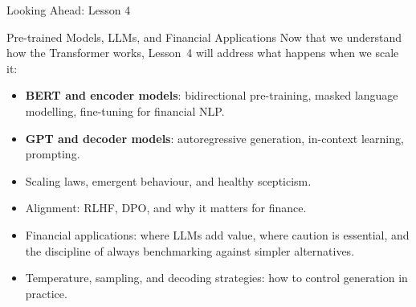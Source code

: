 \documentclass[aspectratio=169]{beamer}
\begin{document}
\begin{frame}{Looking Ahead: Lesson 4}
  \begin{block}{Pre-trained Models, LLMs, and Financial Applications}
    Now that we understand how the Transformer works, Lesson~4 will address what
    happens when we scale it:
  \end{block}
  \begin{itemize}
    \item \textbf{BERT and encoder models}: bidirectional pre-training, masked language
          modelling, fine-tuning for financial NLP.
    \item \textbf{GPT and decoder models}: autoregressive generation, in-context
          learning, prompting.
    \item Scaling laws, emergent behaviour, and healthy scepticism.
    \item Alignment: RLHF, DPO, and why it matters for finance.
    \item Financial applications: where LLMs add value, where caution is essential,
          and the discipline of always benchmarking against simpler alternatives.
    \item Temperature, sampling, and decoding strategies: how to control generation in
          practice.
  \end{itemize}
\end{frame}
%
%
\end{document}
